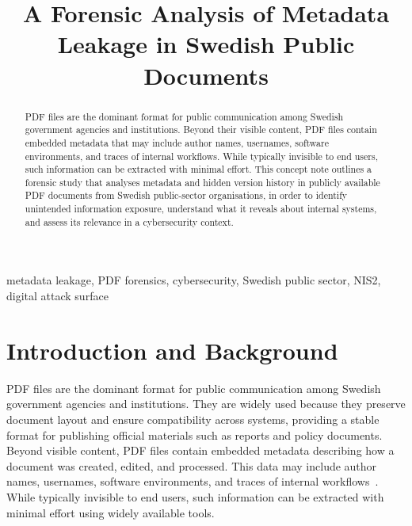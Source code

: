 \documentclass[conference]{IEEEtran}
\begin{document}
\title{A Forensic Analysis of Metadata Leakage in Swedish Public Documents}

\author{
\and
{}
\and
{}
}

\maketitle

\begin{abstract}
PDF files are the dominant format for public communication among Swedish government agencies and institutions. Beyond their visible content, PDF files contain embedded metadata that may include author names, usernames, software environments, and traces of internal workflows. While typically invisible to end users, such information can be extracted with minimal effort. This concept note outlines a forensic study that analyses metadata and hidden version history in publicly available PDF documents from Swedish public-sector organisations, in order to identify unintended information exposure, understand what it reveals about internal systems, and assess its relevance in a cybersecurity context.
\end{abstract}

\begin{IEEEkeywords}
metadata leakage, PDF forensics, cybersecurity, Swedish public sector, NIS2, digital attack surface
\end{IEEEkeywords}

\section{Introduction and Background}

PDF files are the dominant format for public communication among Swedish government agencies and institutions. They are widely used because they preserve document layout and ensure compatibility across systems, providing a stable format for publishing official materials such as reports and policy documents. Beyond visible content, PDF files contain embedded metadata describing how a document was created, edited, and processed. This data may include author names, usernames, software environments, and traces of internal workflows~\cite{b1}. While typically invisible to end users, such information can be extracted with minimal effort using widely available tools.
\end{document}
